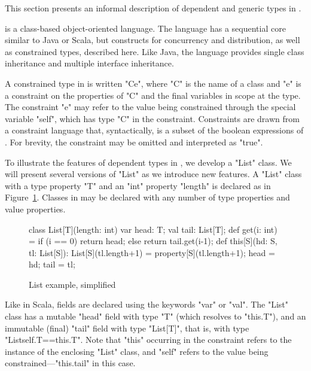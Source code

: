 
This section presents an informal description of 
dependent and generic types in \Xten{}.  

\Xten{} is a class-based object-oriented language.
The language has a sequential core similar to Java or Scala, but
constructs for concurrency and distribution, as well as constrained
types, described here.  Like Java, the language provides single class
inheritance and multiple interface inheritance.

A constrained type in \Xten{} is written \xcd"C{e}", where \xcd"C" is the
name of a class and \xcd"e" is a constraint on the properties of
\xcd"C" and the final variables in scope at the type.  The
constraint \xcd"e" may refer to the value being constrained through
the special variable \xcd"self", which has type \xcd"C" in the
constraint.  Constraints are drawn from a constraint language that,
syntactically, is a subset of the boolean expressions of \Xten{}.  For
brevity, the constraint may be omitted and interpreted as \xcd"true".

To illustrate the features of dependent types in \Xten{}, we develop a \xcd"List"
class.  We will present several versions of \xcd"List" as we
introduce new features.
A \xcd"List" class with a type property \xcd"T" and an \xcd"int"
property \xcd"length" is declared as in Figure~\ref{fig:list0}.
Classes in \Xten{} may be declared with any number of type properties and
value properties.

\begin{figure}
{\footnotesize
\begin{xtennoindent}
class List[T](length: int) {
  var head: T;
  val tail: List[T];
  def get(i: int) = {
    if (i == 0) return head;
    else return tail.get(i-1);
  }
  def this[S](hd: S, tl: List[S]): List[S](tl.length+1) = {
    property[S](tl.length+1);
    head = hd; tail = tl;
  }
}
\end{xtennoindent}
}
\caption{List example, simplified}
\label{fig:list0}
\end{figure}

Like in Scala, fields are declared using the keywords \xcd"var"
or \xcd"val".  The \xcd"List" class has a mutable \xcd"head"
field with type \xcd"T" (which resolves to \xcd"this.T"), and an
immutable (final) \xcd"tail" field with type \xcd"List[T]", that
is, with type \xcd"List{self.T==this.T}".  Note that \xcd"this" occurring
in the constraint refers to the instance of the enclosing
\xcd"List" class,
and \xcd"self" refers to the value being
constrained---\xcd"this.tail" in this case.

